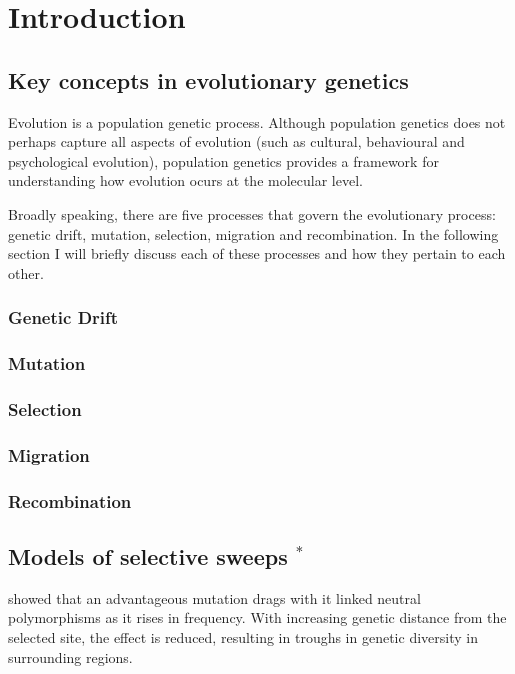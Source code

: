 \chapter{Introduction}

\section[Key concepts]{Key concepts in evolutionary genetics}

Evolution is a population genetic process. Although population genetics does not perhaps capture all aspects of evolution (such as cultural, behavioural and psychological evolution), population genetics provides a framework for understanding how evolution ocurs at the molecular level.

Broadly speaking, there are five processes that govern the evolutionary process: genetic drift, mutation, selection, migration and recombination. In the following section I will briefly discuss each of these processes and how they pertain to each other.

\subsection{Genetic Drift}
\subsection{Mutation}
\subsection{Selection}
\subsection{Migration}
\subsection{Recombination}

\section[Models of selective sweeps]{Models of selective sweeps $^*$}

\cite{RN124} showed that an advantageous mutation drags with it linked neutral polymorphisms as it rises in frequency. With increasing genetic distance from the selected site, the effect is reduced, resulting in troughs in genetic diversity in surrounding regions.
 
